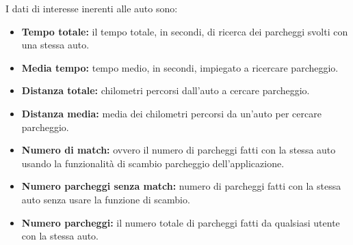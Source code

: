 \documentclass[italian, Lau, oneside, nodefaultfont, noexaminfo]{sapthesis}
\begin{document}
I dati di interesse inerenti alle auto sono:
\begin{itemize}
    \item \textbf{Tempo totale:}  il tempo totale, in secondi, di ricerca dei parcheggi svolti con una stessa auto.
    \item \textbf{Media tempo:} tempo medio, in secondi, impiegato a ricercare parcheggio.
    \item \textbf{Distanza totale:} chilometri percorsi dall'auto a cercare parcheggio.
    \item \textbf{Distanza media:}   media dei chilometri percorsi da un'auto per cercare parcheggio.
    \item \textbf{Numero di match:} ovvero il numero di parcheggi fatti con la stessa auto  usando la funzionalit\`a di scambio parcheggio dell'applicazione.
    \item \textbf{Numero parcheggi senza match:} numero di parcheggi fatti con la stessa auto  senza usare la funzione di scambio. 
    \item \textbf{Numero parcheggi:}  il numero totale di parcheggi fatti da qualsiasi utente con la stessa auto. 
\end{itemize}

\end{document}
